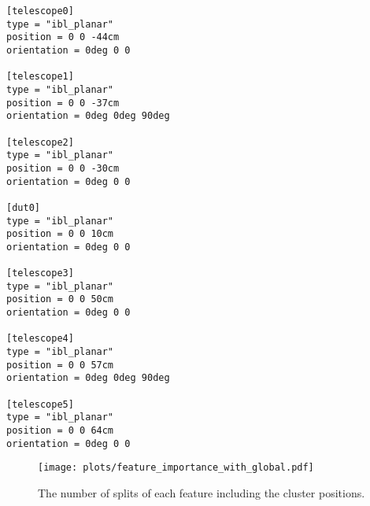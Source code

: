 \clearpage

\begin{lstlisting}[caption={Allpix$^2$ geometry file for all simulations}]
[telescope0]
type = "ibl_planar"
position = 0 0 -44cm
orientation = 0deg 0 0

[telescope1]
type = "ibl_planar"
position = 0 0 -37cm
orientation = 0deg 0deg 90deg

[telescope2]
type = "ibl_planar"
position = 0 0 -30cm
orientation = 0deg 0 0

[dut0]
type = "ibl_planar"
position = 0 0 10cm
orientation = 0deg 0 0

[telescope3]
type = "ibl_planar"
position = 0 0 50cm
orientation = 0deg 0 0

[telescope4]
type = "ibl_planar"
position = 0 0 57cm
orientation = 0deg 0deg 90deg

[telescope5]
type = "ibl_planar"
position = 0 0 64cm
orientation = 0deg 0 0
\end{lstlisting}

\clearpage

\begin{figure}
  \centering
  \texttt{[image: plots/feature\_importance\_with\_global.pdf]}
  \caption{The number of splits of each feature including the cluster positions.}
  \label{fig:importance_global}
\end{figure}
